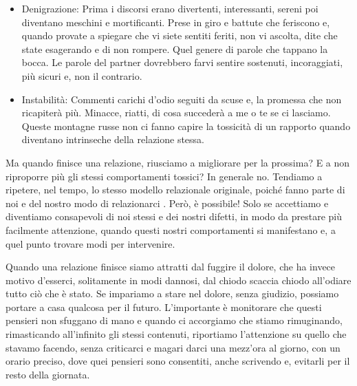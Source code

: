 \documentclass[12pt]{book} %
\begin{document}
\begin{itemize}
\item Denigrazione: Prima i discorsi erano divertenti, interessanti, sereni poi diventano meschini e mortificanti. Prese
in giro e battute che feriscono e, quando provate a spiegare che vi siete sentiti feriti, non vi ascolta, dite che
state esagerando e di non rompere. Quel genere di parole che tappano la bocca. Le parole del partner dovrebbero farvi
sentire sostenuti, incoraggiati, più sicuri e, non il contrario.
\item Instabilità: Commenti carichi d'odio seguiti da scuse e, la promessa che non ricapiterà più.
Minacce, riatti, di cosa succederà a me o te se ci lasciamo. Queste montagne russe non ci fanno capire la tossicità di
un rapporto quando diventano intrinseche della relazione stessa.
\end{itemize}

\bigskip

Ma quando finisce una relazione, riusciamo a migliorare per la prossima? E a non riproporre più gli stessi comportamenti
tossici? In generale no. Tendiamo a ripetere, nel tempo, lo stesso modello relazionale originale, poiché fanno parte di
noi e del nostro modo di relazionarci
. Però, è possibile! Solo se
accettiamo e diventiamo consapevoli di noi stessi e dei nostri difetti, in modo da prestare più facilmente attenzione,
quando questi nostri comportamenti si manifestano e, a quel punto trovare modi per intervenire. 

Quando una relazione finisce siamo attratti dal fuggire il dolore, che ha invece motivo d'esserci,
solitamente in modi dannosi, dal chiodo scaccia chiodo all'odiare tutto ciò che è stato. Se
impariamo a stare nel dolore, senza giudizio, possiamo portare a casa qualcosa per il futuro.
L'importante è monitorare che questi pensieri non sfuggano di mano e quando ci accorgiamo che
stiamo rimuginando, rimasticando all'infinito gli stessi contenuti, riportiamo
l'attenzione su quello che stavamo facendo, senza criticarci e magari darci una
mezz'ora al giorno, con un orario preciso, dove quei pensieri sono consentiti, anche scrivendo e,
evitarli per il resto della giornata.


\bigskip
\end{document}
